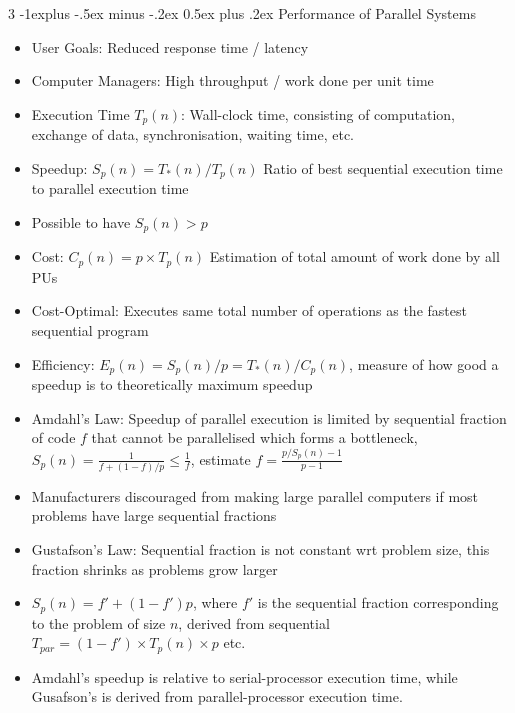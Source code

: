 \documentclass[10pt, landscape]{article}
\makeatletter
\renewcommand{\section}{\@startsection{section}{1}{0mm}%
                                {-1ex plus -.5ex minus -.2ex}%
                                {0.5ex plus .2ex}%
                                {\normalfont\large\bfseries}}
\renewcommand{\section}{\@startsection{section}{2}{0mm}%
                                {-1explus -.5ex minus -.2ex}%
                                {0.5ex plus .2ex}%
                                {\normalfont\normalsize\bfseries}}
\makeatother
\begin{document}
\begin{multicols*}{3}
\section{Performance of Parallel Systems}
\begin{itemize}
    \item User Goals: Reduced response time / latency
    \item Computer Managers: High throughput / work done per unit time
    \item Execution Time $T_p(n)$: Wall-clock time, consisting of computation, exchange of data, synchronisation, waiting time, etc.
    \item Speedup: $S_p(n)=T_*(n)/T_p(n)$ Ratio of best sequential execution time to parallel execution time
    \item Possible to have $S_p(n) > p$
    \item Cost: $C_p(n)=p \times T_p(n)$ Estimation of total amount of work done by all PUs
    \item Cost-Optimal: Executes same total number of operations as the fastest sequential program
    \item Efficiency: $E_p(n)=S_p(n)/p=T_*(n)/C_p(n)$, measure of how good a speedup is to theoretically maximum speedup
    \item Amdahl's Law: Speedup of parallel execution is limited by sequential fraction of code $f$ that cannot be parallelised which forms a bottleneck, $S_p(n)=\frac{1}{f+(1-f)/p}\leq \frac{1}{f}$, estimate $f=\frac{p/S_p(n)-1}{p-1}$
    \item Manufacturers discouraged from making large parallel computers if most problems have large sequential fractions
    \item Gustafson's Law: Sequential fraction is not constant wrt problem size, this fraction shrinks as problems grow larger
    \item $S_p(n)=f'+(1-f')p$, where $f'$ is the sequential fraction corresponding to the problem of size $n$, derived from sequential $T_{par}=(1-f') \times T_p(n) \times p$ etc.
    \item Amdahl's speedup is relative to serial-processor execution time, while Gusafson's is derived from parallel-processor execution time.
\end{itemize}


\end{multicols*}
\end{document}
